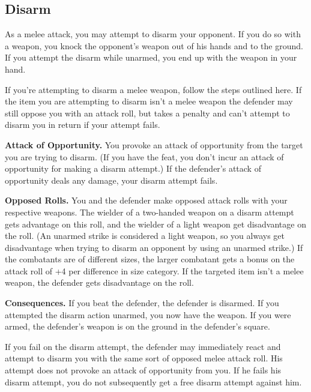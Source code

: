 \subsection{Disarm}
As a melee attack, you may attempt to disarm your opponent. If you do so with a weapon, you knock the opponent's weapon out of his hands and to the ground. If you attempt the disarm while unarmed, you end up with the weapon in your hand.

If you're attempting to disarm a melee weapon, follow the steps outlined here. If the item you are attempting to disarm isn't a melee weapon the defender may still oppose you with an attack roll, but takes a penalty and can't attempt to disarm you in return if your attempt fails.

\begin{enumerate*}
\item \textbf{Attack of Opportunity.} You provoke an attack of opportunity from the target you are trying to disarm. (If you have the  feat, you don't incur an attack of opportunity for making a disarm attempt.) If the defender's attack of opportunity deals any damage, your disarm attempt fails.

\item \textbf{Opposed Rolls.} You and the defender make opposed attack rolls with your respective weapons. The wielder of a two-handed weapon on a disarm attempt gets advantage on this roll, and the wielder of a light weapon get disadvantage on the roll. (An unarmed strike is considered a light weapon, so you always get disadvantage when trying to disarm an opponent by using an unarmed strike.) If the combatants are of different sizes, the larger combatant gets a bonus on the attack roll of +4 per difference in size category. If the targeted item isn't a melee weapon, the defender gets disadvantage on the roll.

\item \textbf{Consequences.} If you beat the defender, the defender is disarmed. If you attempted the disarm action unarmed, you now have the weapon. If you were armed, the defender's weapon is on the ground in the defender's square.
\end{enumerate*}

If you fail on the disarm attempt, the defender may immediately react and attempt to disarm you with the same sort of opposed melee attack roll. His attempt does not provoke an attack of opportunity from you. If he fails his disarm attempt, you do not subsequently get a free disarm attempt against him.

